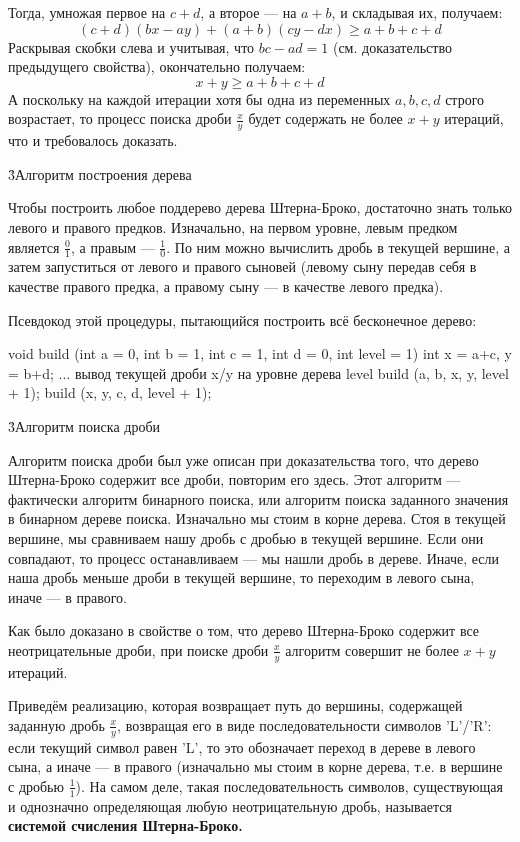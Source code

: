 Тогда, умножая первое на $c+d$, а второе --- на $a+b$, и складывая их, получаем:
$$ (c+d)(bx-ay) + (a+b)(cy-dx) \ge a+b+c+d $$
Раскрывая скобки слева и учитывая, что $bc-ad=1$ (см. доказательство предыдущего свойства), окончательно получаем:
$$ x+y \ge a+b+c+d $$
А поскольку на каждой итерации хотя бы одна из переменных $a, b, c, d$ строго возрастает, то процесс поиска дроби $\frac{x}{y}$ будет содержать не более $x+y$ итераций, что и требовалось доказать.

\h3{Алгоритм построения дерева}

Чтобы построить любое поддерево дерева Штерна-Броко, достаточно знать только левого и правого предков. Изначально, на первом уровне, левым предком является $\frac{0}{1}$, а правым --- $\frac{1}{0}$. По ним можно вычислить дробь в текущей вершине, а затем запуститься от левого и правого сыновей (левому сыну передав себя в качестве правого предка, а правому сыну --- в качестве левого предка).

Псевдокод этой процедуры, пытающийся построить всё бесконечное дерево:

\code
void build (int a = 0, int b = 1, int c = 1, int d = 0, int level = 1) {
	int x = a+c,  y = b+d;
	... вывод текущей дроби x/y на уровне дерева level
	build (a, b, x, y, level + 1);
	build (x, y, c, d, level + 1);
}
\endcode

\h3{Алгоритм поиска дроби}

Алгоритм поиска дроби был уже описан при доказательства того, что дерево Штерна-Броко содержит все дроби, повторим его здесь. Этот алгоритм --- фактически алгоритм бинарного поиска, или алгоритм поиска заданного значения в бинарном дереве поиска. Изначально мы стоим в корне дерева. Стоя в текущей вершине, мы сравниваем нашу дробь с дробью в текущей вершине. Если они совпадают, то процесс останавливаем --- мы нашли дробь в дереве. Иначе, если наша дробь меньше дроби в текущей вершине, то переходим в левого сына, иначе --- в правого.

Как было доказано в свойстве о том, что дерево Штерна-Броко содержит все неотрицательные дроби, при поиске дроби $\frac{x}{y}$ алгоритм совершит не более $x+y$ итераций.

Приведём реализацию, которая возвращает путь до вершины, содержащей заданную дробь $\frac{x}{y}$, возвращая его в виде последовательности символов 'L'/'R': если текущий символ равен 'L', то это обозначает переход в дереве в левого сына, а иначе --- в правого (изначально мы стоим в корне дерева, т.е. в вершине с дробью $\frac{1}{1}$). На самом деле, такая последовательность символов, существующая и однозначно определяющая любую неотрицательную дробь, называется \bf{системой счисления Штерна-Броко}.

